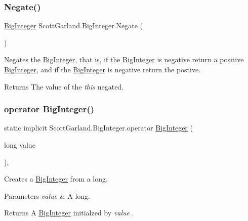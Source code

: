 \subsubsection{\texorpdfstring{Negate()}{Negate()}}
{\footnotesize\ttfamily \hyperlink{class_scott_garland_1_1_big_integer}{Big\+Integer} Scott\+Garland.\+Big\+Integer.\+Negate (\begin{DoxyParamCaption}{ }\end{DoxyParamCaption})\hspace{0.3cm}{\ttfamily [inline]}}



Negates the \hyperlink{class_scott_garland_1_1_big_integer}{Big\+Integer}, that is, if the \hyperlink{class_scott_garland_1_1_big_integer}{Big\+Integer} is negative return a positive \hyperlink{class_scott_garland_1_1_big_integer}{Big\+Integer}, and if the \hyperlink{class_scott_garland_1_1_big_integer}{Big\+Integer} is negative return the postive. 

\begin{DoxyReturn}{Returns}
The value of the {\itshape this}  negated.
\end{DoxyReturn}
\mbox{\label{class_scott_garland_1_1_big_integer_ab7ca7bc80abdb8236d2a02468c7025ec}} 
\subsubsection{\texorpdfstring{operator Big\+Integer()}{operator BigInteger()}\hspace{0.1cm}{\footnotesize\ttfamily [1/4]}}
{\footnotesize\ttfamily static implicit Scott\+Garland.\+Big\+Integer.\+operator \hyperlink{class_scott_garland_1_1_big_integer}{Big\+Integer} (\begin{DoxyParamCaption}\item[{long}]{value }\end{DoxyParamCaption})\hspace{0.3cm}{\ttfamily [inline]}, {\ttfamily [static]}}



Creates a \hyperlink{class_scott_garland_1_1_big_integer}{Big\+Integer} from a long. 


\begin{DoxyParams}{Parameters}
{\em value} & A long.\\
\hline
\end{DoxyParams}
\begin{DoxyReturn}{Returns}
A \hyperlink{class_scott_garland_1_1_big_integer}{Big\+Integer} initialzed by {\itshape value} .
\end{DoxyReturn}
\mbox{\label{class_scott_garland_1_1_big_integer_a969d60de29a3f809ea166e6bd1c77302}} 
